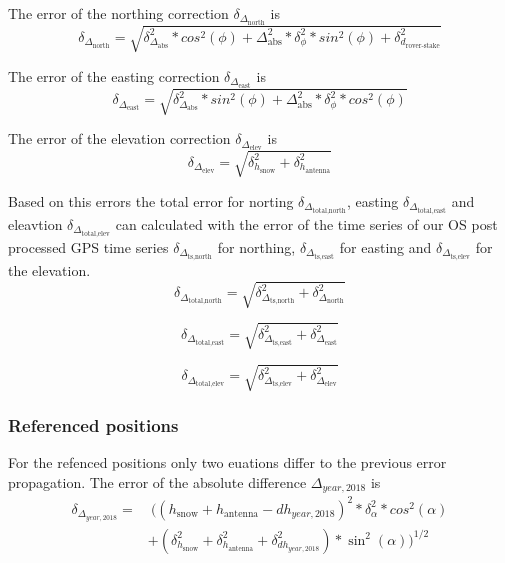 The error of the northing correction $\delta_{\Delta_{\text{north}}}$ is
\begin{equation}
	\delta_{\Delta_{\text{north}}} = \sqrt{\delta_{\Delta_{\text{abs}}}^2 * cos^2(\phi) + \Delta_{\text{abs}}^2 * \delta_{\phi}^2 * sin^2(\phi) + \delta_{d_{\text{rover-stake}}}^2}
\end{equation}

The error of the easting correction $\delta_{\Delta_{\text{east}}}$ is
\begin{equation}
	\delta_{\Delta_{\text{east}}} = \sqrt{\delta_{\Delta_{\text{abs}}}^2 * sin^2(\phi) + \Delta_{\text{abs}}^2 * \delta_{\phi}^2 * cos^2(\phi)}
\end{equation}

The error of the elevation correction $\delta_{\Delta_{\text{elev}}}$ is
\begin{equation}
\delta_{\Delta_{\text{elev}}} = \sqrt{\delta_{h_{\text{snow}}}^2 + \delta_{h_{\text{antenna}}}^2}
\end{equation}
	
Based on this errors the total error for norting $\delta_{\Delta_{\text{total,north}}}$, easting $\delta_{\Delta_{\text{total,east}}}$ and eleavtion $\delta_{\Delta_{\text{total,elev}}}$ can calculated with the error of the time series of our OS post processed GPS time series $\delta_{\Delta_{\text{ts,north}}}$ for northing, $\delta_{\Delta_{\text{ts,east}}}$ for easting and $\delta_{\Delta_{\text{ts,elev}}}$ for the elevation.
\begin{equation}
	\delta_{\Delta_{\text{total,north}}} = \sqrt{\delta_{\Delta_{\text{ts,north}}}^2 + \delta_{\Delta_{\text{north}}}^2}
\end{equation}

\begin{equation}
	\delta_{\Delta_{\text{total,east}}} = \sqrt{\delta_{\Delta_{\text{ts,east}}}^2 + \delta_{\Delta_{\text{east}}}^2}
\end{equation}

\begin{equation}
	\delta_{\Delta_{\text{total,elev}}} = \sqrt{\delta_{\Delta_{\text{ts,elev}}}^2 +\delta_{\Delta_{\text{elev}}}^2}
\end{equation}

\subsubsection*{Referenced positions}
For the refenced positions only two euations differ to the previous error propagation. 
The error of the absolute difference $\Delta_{year,2018}$ is
\begin{equation}
\begin{split}
\delta_{\Delta_{year,2018}} = & 
\ ((h_{\text{snow}} + h_{\text{antenna}} - dh_{year,2018})^2 * \delta_{\alpha}^2 * cos^2(\alpha)\\
&+ (\delta_{h_{\text{snow}}}^2 + \delta_{h_{\text{antenna}}}^2 + \delta_{dh_{year,2018}}^2) * \sin^2(\alpha))^{1/2}
\end{split}
\end{equation}

